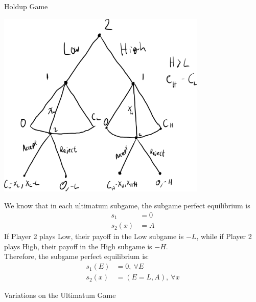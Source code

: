 \documentclass[10pt]{extarticle}
\begin{document}
    \begin{problem}{Holdup Game}
      \begin{center}
        \includegraphics[width=10cm]{images/holdup.png}
      \end{center}
      \tcblower
      We know that in each ultimatum subgame, the subgame perfect equilibrium is
      \begin{align*}
        s_1 &= 0\\
        s_2(x) &= A
      \end{align*}
      If Player 2 plays Low, their payoff in the Low subgame is $-L$, while if Player 2 plays High, their payoff in the High subgame is $-H$.\\

      Therefore, the subgame perfect equilibrium is:
      \begin{align*}
        s_1(E) &= 0,~\forall E\\
        s_2(x) &= (E=L,A),~\forall x
      \end{align*}
    \end{problem}
  \begin{problem}{Variations on the Ultimatum Game}
    \begin{tcbraster}[raster columns = 2,colframe = black!75!white,colback=white]
    \end{tcbraster}
  \end{problem}
\end{document}
